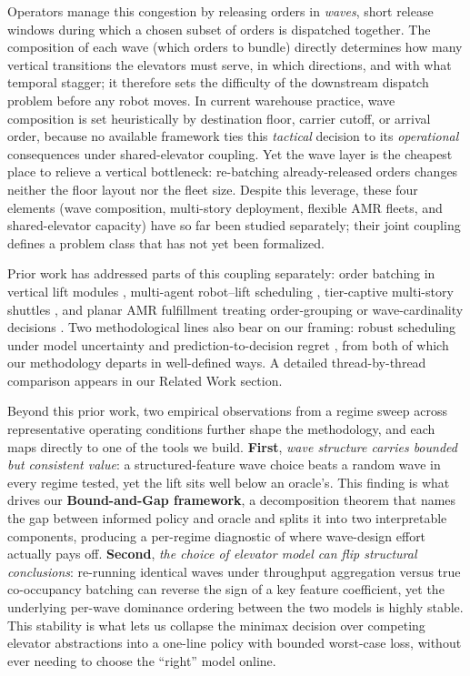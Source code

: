 \documentclass[11pt, a4paper]{article}
\begin{document}
Operators manage this congestion by releasing orders in \emph{waves}, short release windows during which a chosen subset of orders is dispatched together. The composition of each wave (which orders to bundle) directly determines how many vertical transitions the elevators must serve, in which directions, and with what temporal stagger; it therefore sets the difficulty of the downstream dispatch problem before any robot moves. In current warehouse practice, wave composition is set heuristically by destination floor, carrier cutoff, or arrival order, because no available framework ties this \emph{tactical} decision to its \emph{operational} consequences under shared-elevator coupling. Yet the wave layer is the cheapest place to relieve a vertical bottleneck: re-batching already-released orders changes neither the floor layout nor the fleet size. Despite this leverage, these four elements (wave composition, multi-story deployment, flexible AMR fleets, and shared-elevator capacity) have so far been studied separately; their joint coupling defines a problem class that has not yet been formalized.

Prior work has addressed parts of this coupling separately: order batching in vertical lift modules \citep{lenoble2018}, multi-agent robot--lift scheduling \citep{chakravarty2025}, tier-captive multi-story shuttles \citep{wu2024, keung2023}, and planar AMR fulfillment treating order-grouping or wave-cardinality decisions \citep{qin2024, scholz2017, zulj2022}. Two methodological lines also bear on our framing: robust scheduling under model uncertainty \citep{wiesemann2013, lushen2021} and prediction-to-decision regret \citep{elmachtoub2022, vera2021}, from both of which our methodology departs in well-defined ways. A detailed thread-by-thread comparison appears in our Related Work section.

Beyond this prior work, two empirical observations from a regime sweep across representative operating conditions further shape the methodology, and each maps directly to one of the tools we build. \textbf{First}, \emph{wave structure carries bounded but consistent value}: a structured-feature wave choice beats a random wave in every regime tested, yet the lift sits well below an oracle's. This finding is what drives our \textbf{Bound-and-Gap framework}, a decomposition theorem that names the gap between informed policy and oracle and splits it into two interpretable components, producing a per-regime diagnostic of where wave-design effort actually pays off. \textbf{Second}, \emph{the choice of elevator model can flip structural conclusions}: re-running identical waves under throughput aggregation versus true co-occupancy batching can reverse the sign of a key feature coefficient, yet the underlying per-wave dominance ordering between the two models is highly stable. This stability is what lets us collapse the minimax decision over competing elevator abstractions into a one-line policy with bounded worst-case loss, without ever needing to choose the ``right'' model online.
\end{document}
